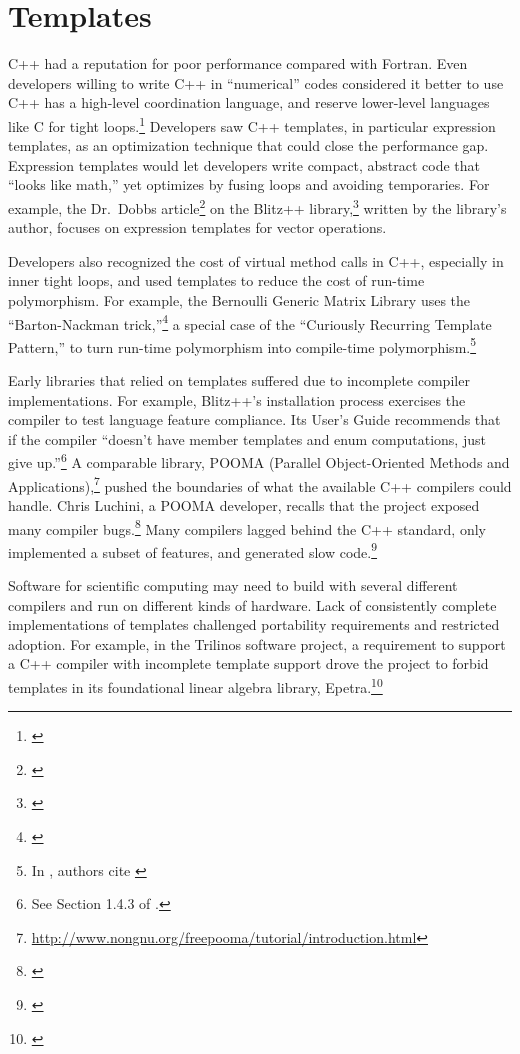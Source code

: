 \section{Templates}

C++ had a reputation for poor performance compared with Fortran. Even developers
willing to write C++ in ``numerical'' codes considered it better to use C++ has a
high-level coordination language, and reserve lower-level languages like C for
tight loops.\footnote{\cite{Arge1997}} Developers saw C++ templates, in particular
expression templates, as an optimization technique that could close the
performance gap. Expression templates would let developers write compact,
abstract code that ``looks like math,'' yet optimizes by fusing loops and avoiding
temporaries. For example, the Dr.\ Dobbs article\footnote{\cite{dobbsblitz1997}}
on the Blitz++ library,\footnote{\cite{blitz2005}} written by the
library's author, focuses on expression templates for vector operations.

Developers also recognized the cost of virtual method calls in C++,
especially in inner tight loops, and used templates to reduce the cost
of run-time polymorphism.  For example, the Bernoulli Generic Matrix
Library uses the ``Barton-Nackman trick,''\footnote{\cite{Barton1994}}
a special case of the ``Curiously Recurring Template Pattern,'' to
turn run-time polymorphism into compile-time polymorphism.\footnote{In
  \cite{Mateev2000}, authors cite \cite{Veldhuizen2000}}

Early libraries that relied on templates suffered due to incomplete compiler
implementations. For example, Blitz++'s installation process exercises the
compiler to test language feature compliance. Its User's Guide recommends that
if the compiler ``doesn't have member templates and enum computations, just give
up.''\footnote{See Section 1.4.3 of \cite{blitz2005}.} A comparable library,
POOMA (Parallel Object-Oriented Methods and
Applications),\footnote{\url{http://www.nongnu.org/freepooma/tutorial/introduction.html}}
pushed the boundaries of what the available C++
compilers could handle. Chris Luchini, a POOMA developer, recalls that the
project exposed many compiler bugs.\footnote{\cite{hoemmen2018history}}
Many compilers lagged behind the C++ standard,
only implemented a subset of features,
and generated slow code.\footnote{\cite{Mateev2000}}

Software for scientific computing may need to build with several different
compilers and run on different kinds of hardware. Lack of consistently complete
implementations of templates challenged portability requirements and restricted
adoption. For example, in the Trilinos software project, a requirement to
support a C++ compiler with incomplete template support drove the project to
forbid templates in its foundational linear algebra library, Epetra.\footnote{\cite{hoemmen2018history}}

